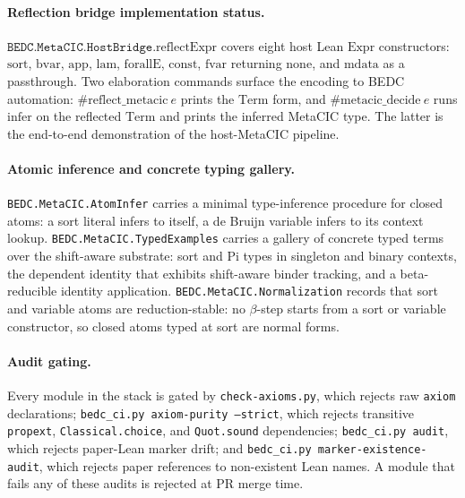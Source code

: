 \paragraph{Reflection bridge implementation status.}
$\texttt{BEDC.MetaCIC.HostBridge}.\mathrm{reflectExpr}$ covers eight
host Lean $\mathrm{Expr}$ constructors: $\mathrm{sort}$,
$\mathrm{bvar}$, $\mathrm{app}$, $\mathrm{lam}$,
$\mathrm{forallE}$, $\mathrm{const}$, $\mathrm{fvar}$ returning
$\mathrm{none}$, and $\mathrm{mdata}$ as a passthrough. Two elaboration
commands surface the encoding to BEDC automation:
$\#\mathrm{reflect\_metacic}\ e$ prints the $\mathrm{Term}$ form, and
$\#\mathrm{metacic\_decide}\ e$ runs $\mathrm{infer}$ on the reflected
$\mathrm{Term}$ and prints the inferred MetaCIC type. The latter is the
end-to-end demonstration of the host-MetaCIC pipeline.

\paragraph{Atomic inference and concrete typing gallery.}
\texttt{BEDC.MetaCIC.AtomInfer} carries a minimal type-inference procedure
for closed atoms: a sort literal infers to itself, a de Bruijn variable
infers to its context lookup.
\texttt{BEDC.MetaCIC.TypedExamples} carries a gallery of concrete typed
terms over the shift-aware substrate: sort and Pi types in singleton and
binary contexts, the dependent identity that exhibits shift-aware binder
tracking, and a beta-reducible identity application.
\texttt{BEDC.MetaCIC.Normalization} records that sort and variable atoms
are reduction-stable: no $\beta$-step starts from a sort or variable
constructor, so closed atoms typed at sort are normal forms.

\paragraph{Audit gating.} Every module in the stack is gated by
\texttt{check-axioms.py}, which rejects raw \texttt{axiom} declarations;
\texttt{bedc\_ci.py axiom-purity --strict}, which rejects transitive
\texttt{propext}, \texttt{Classical.choice}, and \texttt{Quot.sound}
dependencies; \texttt{bedc\_ci.py audit}, which rejects paper-Lean marker
drift; and \texttt{bedc\_ci.py marker-existence-audit}, which rejects paper
references to non-existent Lean names. A module that fails any of these
audits is rejected at PR merge time.

